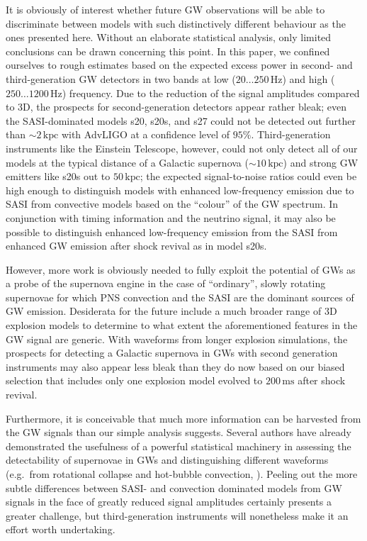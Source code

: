 It is obviously of interest whether future GW observations will be
able to discriminate between models with such distinctively different
behaviour as the ones presented here. Without an elaborate statistical
analysis, only limited conclusions can be drawn concerning this point. In this
paper, we confined ourselves to rough estimates based on the expected
excess power in second- and third-generation GW detectors in two bands
at low ($20 \ldots 250 \, \mathrm{Hz}$) and high ($250 \ldots 1200
\, \mathrm{Hz}$) frequency. Due to the reduction of the signal
amplitudes compared to 3D, the prospects for second-generation
detectors appear rather bleak; even the SASI-dominated models s20,
s20s, and s27 could not be detected out further than $\mathord{\sim} 2
\, \mathrm{kpc}$ with AdvLIGO at a confidence level of
$95\%$. Third-generation instruments like the Einstein Telescope,
however, could not only detect all of our models at the typical
distance of a Galactic supernova ($\mathord{\sim} 10 \, \mathrm{kpc}$) and
strong GW emitters like s20s out to $50 \, \mathrm{kpc}$; the expected
signal-to-noise ratios could even be high enough to distinguish models
with enhanced low-frequency emission due to SASI from convective
models based on the ``colour'' of the GW spectrum. In conjunction with
timing information and the neutrino signal, it may also be possible
to distinguish enhanced low-frequency emission from the SASI
from enhanced GW emission after shock revival as in model s20s.

However, more work is obviously needed to fully exploit the potential
of GWs as a probe of the supernova engine in the case of ``ordinary'',
slowly rotating supernovae for which PNS convection and the SASI are
the dominant sources of GW emission. Desiderata for
the future include a much broader range of 3D explosion
models to determine to what extent the aforementioned features in the
GW signal are generic. With waveforms from longer explosion simulations,
the prospects for detecting a Galactic supernova in GWs with second
generation instruments may also
appear less bleak than they do now based on our biased selection that
includes only one explosion model evolved to $200 \, \mathrm{ms}$
after shock revival.

Furthermore, it is conceivable that much more information can be
harvested from the GW signals than our simple analysis
suggests. Several authors \citep{logue_12,hayama_15,gossan_15} have
already demonstrated the usefulness of a powerful statistical
machinery in assessing the detectability of supernovae in GWs and
distinguishing different waveforms (e.g.\ from rotational collapse and
hot-bubble convection, \citealp{logue_12}). Peeling out the more
subtle differences between SASI- and convection dominated models from
GW signals in the face of greatly reduced signal amplitudes certainly
presents a greater challenge, but third-generation instruments will 
nonetheless make it an effort worth undertaking.

